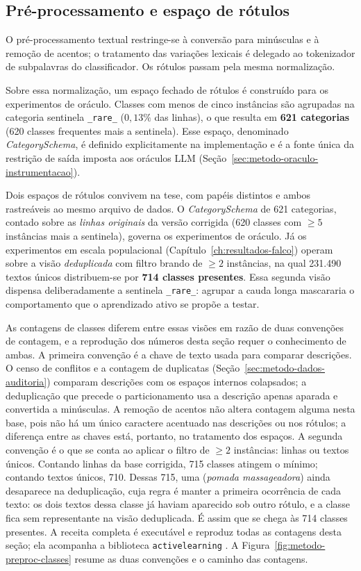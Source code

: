 \subsection{Pré-processamento e espaço de rótulos}
\label{sec:metodo-dados-preproc}

O pré-processamento textual restringe-se à conversão para minúsculas e à
remoção de acentos; o tratamento das variações lexicais é delegado ao
tokenizador de subpalavras do classificador. Os rótulos passam pela mesma
normalização.

Sobre essa normalização, um espaço fechado de rótulos é construído para os
experimentos de oráculo. Classes com menos de cinco instâncias são agrupadas na
categoria sentinela \texttt{\_rare\_} ($0{,}13\%$ das linhas), o que resulta em
\textbf{621 categorias} (620 classes frequentes mais a sentinela). Esse espaço,
denominado \textit{CategorySchema}, é definido explicitamente na
implementação e é a fonte única da restrição de saída imposta aos oráculos LLM
(Seção~\ref{sec:metodo-oraculo-instrumentacao}).

Dois espaços de rótulos convivem na tese, com papéis distintos e ambos
rastreáveis ao mesmo arquivo de dados. O \textit{CategorySchema} de 621
categorias, contado sobre as \emph{linhas originais} da versão corrigida (620 classes
com $\ge 5$ instâncias mais a sentinela), governa os experimentos de oráculo. Já os experimentos em escala populacional
(Capítulo~\ref{ch:resultados-falco}) operam sobre a visão \emph{deduplicada} com
filtro brando de $\ge 2$ instâncias, na qual 231.490 textos únicos distribuem-se
por \textbf{714 classes presentes}. Essa segunda visão dispensa deliberadamente a sentinela
\texttt{\_rare\_}: agrupar a cauda longa mascararia o
comportamento que o aprendizado ativo se propõe a testar.

As contagens de classes diferem entre essas visões em razão de duas
convenções de contagem, e a reprodução dos números desta seção requer o
conhecimento de ambas. A primeira convenção é a chave
de texto usada para comparar descrições. O censo de conflitos e a contagem de
duplicatas (Seção~\ref{sec:metodo-dados-auditoria}) comparam descrições com
os espaços internos colapsados; a deduplicação que precede o particionamento
usa a descrição apenas aparada e convertida a minúsculas. A remoção de
acentos não altera contagem alguma nesta base, pois não há um único caractere
acentuado nas descrições ou nos rótulos; a diferença entre as chaves está,
portanto, no tratamento dos espaços. A segunda convenção é o que se conta ao
aplicar o filtro de $\ge 2$ instâncias: linhas ou textos únicos. Contando
linhas da base corrigida, 715 classes atingem o mínimo; contando textos
únicos, 710. Dessas 715, uma (\textit{pomada massageadora}) ainda desaparece
na deduplicação, cuja regra é manter a primeira ocorrência de cada texto: os
dois textos dessa classe já haviam aparecido sob outro rótulo, e a classe
fica sem representante na visão deduplicada. É assim que se chega às 714
classes presentes. A receita completa é executável e reproduz todas as
contagens desta seção; ela acompanha a biblioteca \texttt{activelearning}
\cite{DaruActiveLearning}. A Figura~\ref{fig:metodo-preproc-classes} resume
as duas convenções e o caminho das contagens.

